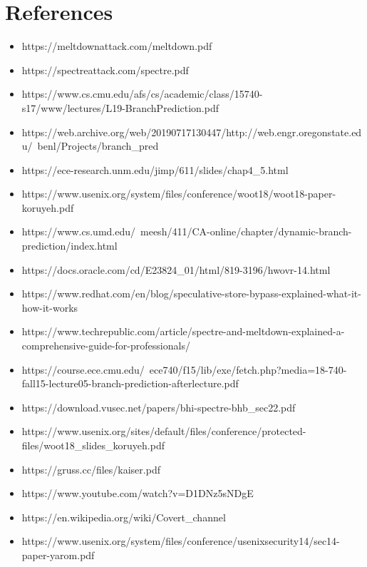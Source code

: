 \newpage
\section{References}
\begin{itemize}
    \item https://meltdownattack.com/meltdown.pdf
    \item https://spectreattack.com/spectre.pdf
    \item https://www.cs.cmu.edu/afs/cs/academic/class/15740-s17/www/lectures/L19-BranchPrediction.pdf
    \item https://web.archive.org/web/20190717130447/http://web.engr.oregonstate.edu/~benl/Projects/branch\_pred
    \item https://ece-research.unm.edu/jimp/611/slides/chap4\_5.html
    \item https://www.usenix.org/system/files/conference/woot18/woot18-paper-koruyeh.pdf
    \item https://www.cs.umd.edu/~meesh/411/CA-online/chapter/dynamic-branch-prediction/index.html
    \item https://docs.oracle.com/cd/E23824\_01/html/819-3196/hwovr-14.html
    \item https://www.redhat.com/en/blog/speculative-store-bypass-explained-what-it-how-it-works
    \item https://www.techrepublic.com/article/spectre-and-meltdown-explained-a-comprehensive-guide-for-professionals/
    \item https://course.ece.cmu.edu/~ece740/f15/lib/exe/fetch.php?media=18-740-fall15-lecture05-branch-prediction-afterlecture.pdf
    \item https://download.vusec.net/papers/bhi-spectre-bhb\_sec22.pdf
    \item https://www.usenix.org/sites/default/files/conference/protected-files/woot18\_slides\_koruyeh.pdf
    \item https://gruss.cc/files/kaiser.pdf
    \item https://www.youtube.com/watch?v=D1DNz5sNDgE
    \item https://en.wikipedia.org/wiki/Covert\_channel
    \item https://www.usenix.org/system/files/conference/usenixsecurity14/sec14-paper-yarom.pdf
\end{itemize}
